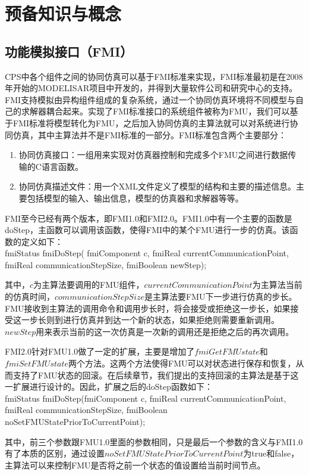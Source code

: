 \chapter{预备知识与概念}
\label{ch2}
\section{功能模拟接口（FMI）}
CPS中各个组件之间的协同仿真可以基于FMI标准来实现，FMI标准最初是在2008年开始的MODELISAR项目中开发的，并得到大量软件公司和研究中心的支持。FMI支持模拟由异构组件组成的复杂系统，通过一个协同仿真环境将不同模型与自己的求解器耦合起来。实现了FMI标准接口的系统组件被称为FMU，我们可以基于FMI标准将模型转化为FMU，之后加入协同仿真的主算法就可以对系统进行协同仿真，其中主算法并不是FMI标准的一部分。FMI标准包含两个主要部分：
\begin{enumerate}
\item 协同仿真接口：一组用来实现对仿真器控制和完成多个FMU之间进行数据传输的C语言函数。
\item 协同仿真描述文件：用一个XML文件定义了模型的结构和主要的描述信息。主要包括模型的输入、输出信息，模型的仿真器和求解器等等。
\end{enumerate}
FMI至今已经有两个版本，即FMI1.0和FMI2.0\cite{Broman2013Determinate}。FMI1.0中有一个主要的函数是doStep，主函数可以调用该函数，使得FMI中的某个FMU进行一步的仿真。该函数的定义如下：\\
fmiStatus fmiDoStep( fmiComponent c, fmiReal currentCommunicationPoint, fmiReal communicationStepSize, fmiBoolean newStep); 

其中，$c$为主算法要调用的FMU组件，$currentCommunicationPoint$为主算法当前的仿真时间，$communicationStepSize$是主算法要FMU下一步进行仿真的步长。FMU接收到主算法的调用命令和调用步长时，将会接受或拒绝这一步长，如果接受这一步长则到进行仿真并到达一个新的状态，如果拒绝则需要重新调用。$newStep$用来表示当前的这一次仿真是一次新的调用还是拒绝之后的再次调用。

FMI2.0针对FMU1.0做了一定的扩展，主要是增加了$fmiGetFMUstate$和$fmiSetFMUstate$两个方法。这两个方法使得FMU可以对状态进行保存和恢复，从而支持了FMU状态的回滚。在后续章节，我们提出的支持回滚的主算法是基于这一扩展进行设计的。因此，扩展之后的doStep函数如下：\\
fmiStatus fmiDoStep(fmiComponent c, fmiReal currentCommunicationPoint, fmiReal communicationStepSize, fmiBoolean noSetFMUStatePriorToCurrentPoint);

其中，前三个参数跟FMU1.0里面的参数相同，只是最后一个参数的含义与FMI1.0有了本质的区别，通过设置$noSetFMUStatePriorToCurrentPoint$为true和false，主算法可以来控制FMU是否将之前一个状态的值设置给当前时间节点。
